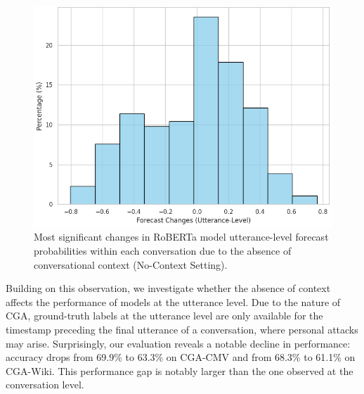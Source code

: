 \begin{figure}[ht]
    \centering
    \includegraphics[width=\linewidth]{figures/utt_level_changes.png}
    \caption{Most significant changes in RoBERTa model utterance-level forecast probabilities within each conversation due to the absence of conversational context (No-Context Setting).}
    \label{fig:utt_level_changes}
\end{figure}

Building on this observation, we investigate whether the absence of context affects the performance of models at the utterance level. 
%
Due to the nature of CGA, ground-truth labels at the utterance level are only available for the timestamp preceding the final utterance of a conversation, where personal attacks may arise. 
%
Surprisingly, our evaluation reveals a notable decline in performance: accuracy drops from 69.9\% to 63.3\% on CGA-CMV and from 68.3\% to 61.1\% on CGA-Wiki. 
%
This performance gap is notably larger than the one observed at the conversation level.

